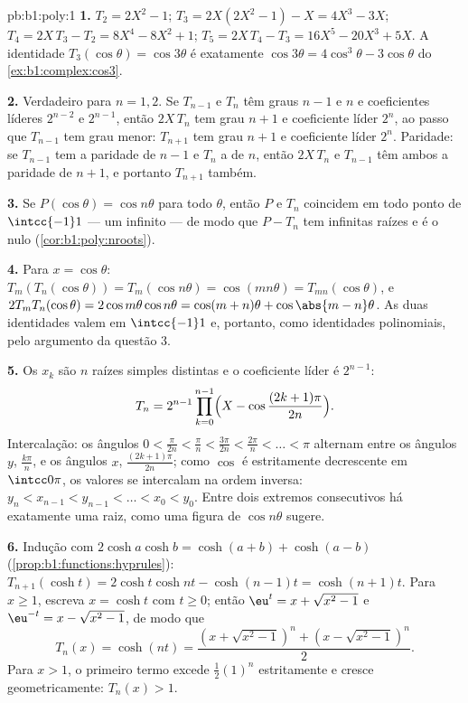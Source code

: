 \begin{solution}{pb:b1:poly:1}
\textbf{1.} $T_2 = 2X^2 - 1$; $T_3 = 2X(2X^2 - 1) - X = 4X^3 -
3X$; $T_4 = 2X\,T_3 - T_2 = 8X^4 - 8X^2 + 1$; $T_5 = 2X\,T_4 - T_3
= 16X^5 - 20X^3 + 5X$. A identidade $T_3(\cos\theta) = \cos3\theta$
é exatamente $\cos3\theta = 4\cos^3\theta - 3\cos\theta$ do
\cref{ex:b1:complex:cos3}.

\textbf{2.} Verdadeiro para $n = 1, 2$. Se $T_{n-1}$ e $T_n$ têm graus
$n-1$ e $n$ e coeficientes líderes $2^{n-2}$ e $2^{n-1}$, então
$2X\,T_n$ tem grau $n+1$ e coeficiente líder $2^n$, ao passo que
$T_{n-1}$ tem grau menor: $T_{n+1}$ tem grau $n + 1$ e coeficiente
líder $2^n$. Paridade: se $T_{n-1}$ tem a paridade de $n - 1$
e $T_n$ a de $n$, então $2X\,T_n$ e $T_{n-1}$ têm ambos a
paridade de $n + 1$, e portanto $T_{n+1}$ também.

\textbf{3.} Se $P(\cos\theta) = \cos n\theta$ para todo $\theta$,
então $P$ e $T_n$ coincidem em todo ponto de $\intcc{-1}1$ --- um
 infinito --- de modo que $P - T_n$ tem infinitas raízes e é o
 nulo (\cref{cor:b1:poly:nroots}).

\textbf{4.} Para $x = \cos\theta$: $T_m(T_n(\cos\theta)) =
T_m(\cos n\theta) = \cos(mn\theta) = T_{mn}(\cos\theta)$, e
$2T_mT_n(\cos\theta) = 2\cos m\theta\cos n\theta = \cos(m+n)\theta
+ \cos\abs{m - n}\theta$. As duas identidades valem em $\intcc{-1}1$ e,
portanto, como identidades polinomiais, pelo argumento da questão 3.

\textbf{5.} Os $x_k$ são $n$ raízes simples distintas e o
coeficiente líder é $2^{n-1}$:
\[
T_n = 2^{n-1}\prod_{k=0}^{n-1}
\Bigl(X - \cos\frac{(2k+1)\pi}{2n}\Bigr) .
\]
Intercalação: os ângulos $0 < \frac{\pi}{2n} < \frac\pi n <
\frac{3\pi}{2n} < \frac{2\pi}n < \dots < \pi$ alternam entre
os ângulos $y$, $\frac{k\pi}n$, e os ângulos $x$,
$\frac{(2k+1)\pi}{2n}$; como $\cos$ é estritamente decrescente em
$\intcc0\pi$, os valores se intercalam na ordem inversa: $y_n <
x_{n-1} < y_{n-1} < \dots < x_0 < y_0$. Entre dois extremos consecutivos
há exatamente uma raiz, como uma figura de $\cos n\theta$
sugere.

\textbf{6.} Indução com $2\cosh a\cosh b = \cosh(a + b) +
\cosh(a - b)$ (\cref{prop:b1:functions:hyprules}): $T_{n+1}(\cosh
t) = 2\cosh t\cosh nt - \cosh(n-1)t = \cosh(n+1)t$. Para $x \geq
1$, escreva $x = \cosh t$ com $t \geq 0$; então $\eu^t = x +
\sqrt{x^2 - 1}$ e $\eu^{-t} = x - \sqrt{x^2 - 1}$, de modo que
\[
T_n(x) = \cosh(nt)
= \frac{(x + \sqrt{x^2-1})^n + (x - \sqrt{x^2-1})^n}2 .
\]
Para $x > 1$, o primeiro termo excede $\frac12(1)^n$ estritamente e
cresce geometricamente: $T_n(x) > 1$.


\end{solution}
